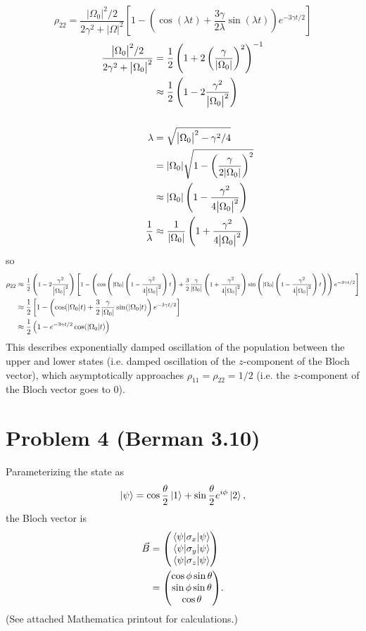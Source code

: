 \documentclass[12pt]{article}
\newcommand{\magsq}[1]{\big|#1\big|^2}
\begin{document}
\[ \rho_{22} = \frac{\magsq{\Omega_0}/2}{2\gamma^2 + \magsq{\Omega}}\left[1 - \left(\cos(\lambda t) + \frac{3\gamma}{2\lambda}\sin(\lambda t)\right)e^{-3\gamma t/2}\right] \]
\begin{align*}
    \frac{\magsq{\Omega_0}/2}{2\gamma^2 + \magsq{\Omega_0}} &= \frac{1}{2}\left(1 + 2\left(\frac{\gamma}{\abs{\Omega_0}}\right)^2\right)^{-1} \\
    &\approx \frac{1}{2}\left(1 - 2\frac{\gamma^2}{\magsq{\Omega_0}}\right) \\
    \\
    \lambda &= \sqrt{\magsq{\Omega_0} - \gamma^2/4} \\
    &= \abs{\Omega_0}\sqrt{1 - \left(\frac{\gamma}{2\abs{\Omega_0}}\right)^2}\\
    &\approx \abs{\Omega_0}\left(1 - \frac{\gamma^2}{4\magsq{\Omega_0}}\right) \\
    \frac{1}{\lambda} &\approx \frac{1}{\abs{\Omega_0}}\left(1 + \frac{\gamma^2}{4\magsq{\Omega_0}}\right)
\end{align*}
so
\begin{align*}
    \rho_{22} &\approx \medmath{\frac{1}{2}\left(1 - 2\frac{\gamma^2}{\magsq{\Omega_0}}\right)\left[1 - \left(\cos\left(\abs{\Omega_0}\left(1 - \frac{\gamma^2}{4\magsq{\Omega_0}}\right)t\right)+\frac{3}{2}\frac{\gamma}{\abs{\Omega_0}}\left(1 + \frac{\gamma^2}{4\magsq{\Omega_0}}\right)\sin\left(\abs{\Omega_0}\left(1 - \frac{\gamma^2}{4\magsq{\Omega_0}}\right)t\right)\right)e^{-3\gamma t/2}\right]} \\
    &\approx \frac{1}{2}\left[1 - \left(\cos(\abs{\Omega_0}t) + \frac{3}{2}\frac{\gamma}{\abs{\Omega_0}}\sin(\abs{\Omega_0}t)\right)e^{-3\gamma t/2}\right] \\
    &\approx \frac{1}{2}\left(1 - e^{-3\gamma t/2}\cos(\abs{\Omega_0}t)\right)
\end{align*}
This describes exponentially damped oscillation of the population between the upper and lower states (i.e. damped oscillation of the $z$-component of the Bloch vector), which asymptotically approaches $\rho_{11} = \rho_{22} = 1/2$ (i.e. the $z$-component of the Bloch vector goes to 0).


\section*{Problem 4 (Berman 3.10)}
Parameterizing the state as
\[ \ket{\psi} = \cos\frac{\theta}{2}\ket{1} + \sin\frac{\theta}{2}e^{i\phi}\ket{2}, \]
the Bloch vector is
\begin{align*}
    \vec{B} &= \mqty(\mel{\psi}{\sigma_x}{\psi} \\ \mel{\psi}{\sigma_y}{\psi} \\ \mel{\psi}{\sigma_z}{\psi}) \\
    &= \mqty(\cos\phi\sin\theta\\\sin\phi\sin\theta\\\cos\theta).
\end{align*}
(See attached Mathematica printout for calculations.)
\end{document}
